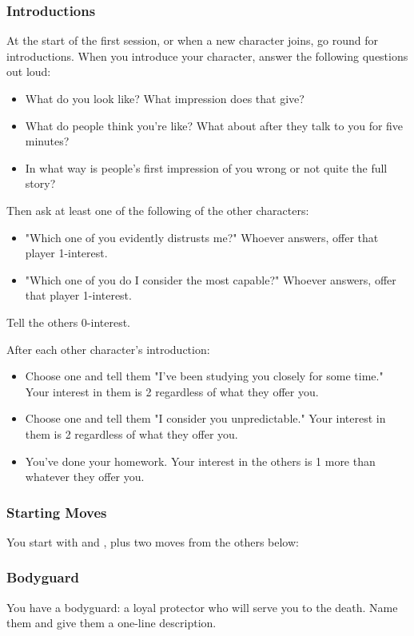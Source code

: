 \subsubsection{Introductions}
At the start of the first session, or when a new character joins, go round for introductions.
When you introduce your character, answer the following questions out loud:
\begin{itemize}
\item What do you look like? What impression does that give?
\item What do people think you're like? What about after they talk to you for five minutes?
\item In what way is people's first impression of you wrong or not quite the full story?
\end{itemize}

Then ask at least one of the following of the other characters:
\begin{itemize}
\item "Which one of you evidently distrusts me?" Whoever answers, offer that player 1-interest.
\item "Which one of you do I consider the most capable?" Whoever answers, offer that player 1-interest.
\end{itemize}
Tell the others 0-interest.

After each other character's introduction:
\begin{itemize}
\item Choose one and tell them "I've been studying you closely for some time." Your interest in them is 2 regardless of what they offer you.
\item Choose one and tell them "I consider you unpredictable." Your interest in them is 2 regardless of what they offer you.
\item You’ve done your homework. Your interest in the others is 1 more than whatever they offer you.
\end{itemize}

\subsubsection{Starting Moves}
You start with  and , plus two moves from the others below:

\subsubsection{Bodyguard}\label{sec:Bodyguard}
You have a bodyguard: a loyal protector who will serve you to the death. Name them and give them a one-line description.

